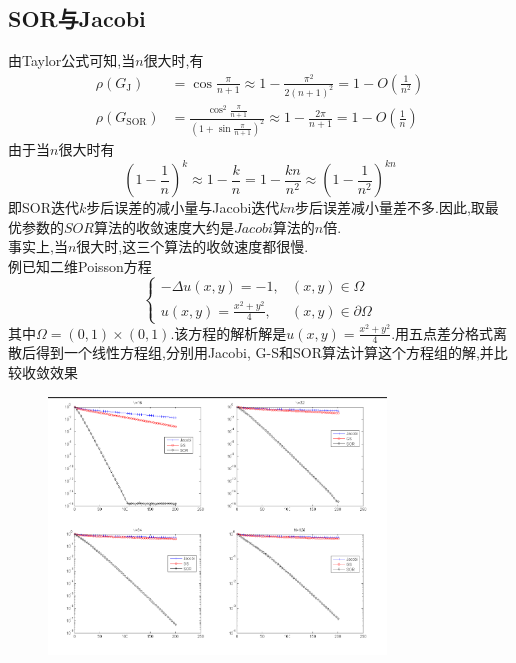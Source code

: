 \documentclass[12pt,a4paper]{article}
\begin{document}
\subsection*{SOR与Jacobi}
由Taylor公式可知,当$n$很大时,有
$$
\begin{aligned} \rho\left(G_{\mathrm{J}}\right) &=\cos \frac{\pi}{n+1} \approx 1-\frac{\pi^{2}}{2(n+1)^{2}}=1-O\left(\frac{1}{n^{2}}\right) \\ \rho\left(G_{\mathrm{SOR}}\right) &=\frac{\cos ^{2} \frac{\pi}{n+1}}{\left(1+\sin \frac{\pi}{n+1}\right)^{2}} \approx 1-\frac{2 \pi}{n+1}=1-O\left(\frac{1}{n}\right) \end{aligned}
$$
由于当$n$很大时有
$$
\left(1-\frac{1}{n}\right)^{k} \approx 1-\frac{k}{n}=1-\frac{k n}{n^{2}} \approx\left(1-\frac{1}{n^{2}}\right)^{k n}
$$
即SOR迭代$k$步后误差的减小量与Jacobi迭代$kn$步后误差减小量差不多.因此,取最优参数的$SOR$算法的收敛速度大约是$Jacobi$算法的$n$倍.\\
事实上,当$n$很大时,这三个算法的收敛速度都很慢.\\
{\color{blue}例}\quad 已知二维Poisson方程
$$
\left\{\begin{array}{ll}
{-\Delta u(x, y)=-1,} & {(x, y) \in \Omega} \\ 
{u(x, y)=\frac{x^{2}+y^{2}}{4},} & {(x, y) \in \partial \Omega}\end{array}\right.
$$
其中$\Omega=(0,1) \times(0,1)$.该方程的解析解是$u(x, y)=\frac{x^{2}+y^{2}}{4}$.用五点差分格式离散后得到一个线性方程组,分别用Jacobi, G-S和SOR算法计算这个方程组的解,并比较收敛效果
\begin{figure}[h]
\centering 
\includegraphics[width=0.8\textwidth]{./figures/figure3.png} 
\end{figure}
\end{document}
